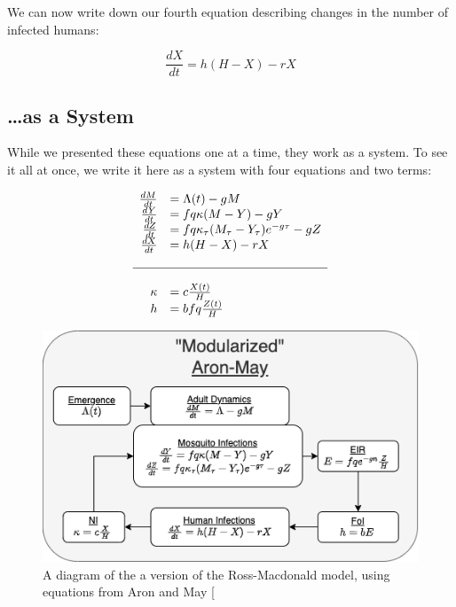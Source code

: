 \documentclass[
]{book}
\begin{document}
We can now write down our fourth equation describing changes in the number of infected humans:

\begin{equation}
\frac{dX}{dt} = h (H-X) - r X 
\end{equation}

\subsection{\ldots as a System}\label{as-a-system}

While we presented these equations one at a time, they work as a system. To see it all at once, we write it here as a system with four equations and two terms:

\begin{equation}
\begin{array}{rl}
\frac{dM}{dt} &= \Lambda(t) - g M \\
\frac{dY}{dt} &= fq\kappa(M-Y) - g Y \\
\frac{dZ}{dt} &= fq\kappa_\tau(M_\tau-Y_\tau)e^{-g\tau} - g Z \\
\frac{dX}{dt} &= h (H-X) - rX  \\ \\ \hline \\ 
\kappa &= c \frac{X(t)}{H} \\
h &= b fq \frac{Z(t)}{H} \\
\end{array}
\end{equation}

\begin{figure}
\centering
\includegraphics{Figures/AronMay.png}
\caption{A diagram of the a version of the Ross-Macdonald model, using equations from Aron and May {[}\citeproc{ref-AronJL1982PopulationDynamics}{54}{]}}
\end{figure}
\end{document}
